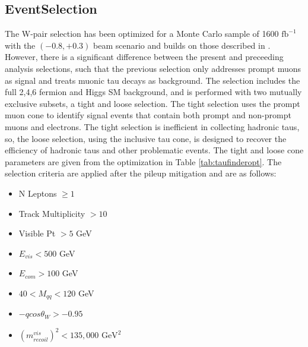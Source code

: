 \subsection{EventSelection}
\label{subsec:EventSelection}
The W-pair selection has been optimized for a Monte Carlo sample of 1600 $\text{fb}^{-1}$ with the $(-0.8,+0.3)$ beam scenario and builds on those described in \cite{ivan}. However, there is a significant difference between the present and preceeding analysis selections, such that  the previous selection only addresses prompt muons as signal and treats muonic tau decays as background. The selection includes the full 2,4,6 fermion and Higgs SM background, and is performed with two mutually exclusive subsets, a tight and loose selection. The tight selection uses the prompt muon cone to identify signal events that contain both prompt and non-prompt muons and electrons. The tight selection is inefficient in collecting hadronic taus, so, the loose selection, using the inclusive tau cone, is designed to recover the efficiency of hadronic taus and other problematic events. The tight and loose cone parameters are given from the optimization in Table \ref{tab:taufinderopt}. The selection criteria are applied after the pileup mitigation and are as follows:
\begin{itemize}
\item N Leptons $\geq 1$
\item Track Multiplicity $> 10$  
\item Visible Pt $> 5$ GeV  
\item $E_{vis} < 500$ GeV 
\item $E_{com} > 100$ GeV
\item $40<M_{qq}<120$ GeV
\item  $-qcos\theta_W > -0.95$
\item  $(m^{vis}_{recoil})^2 < 135,000 \, \, \text{GeV}^2$
\end{itemize}

